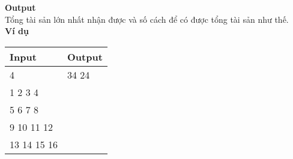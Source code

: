 \textbf{Output}
\\
Tổng tài sản lớn nhất nhận được và số cách để có được tổng tài sản như thế.
\\

\textbf{Ví dụ}
\begin{table}[h!]
    \begin{center}
        \begin{tabular}{|p{7cm}|p{5cm}|}
            \hline
            \textbf{Input} & \textbf{Output} \\ 
            \hline
            4 & 34 24 \\
            1 2 3 4 & \\
            5 6 7 8 & \\
            9 10 11 12 & \\
            13 14 15 16 & \\
            \hline
        \end{tabular}
    \end{center}
\end{table}




